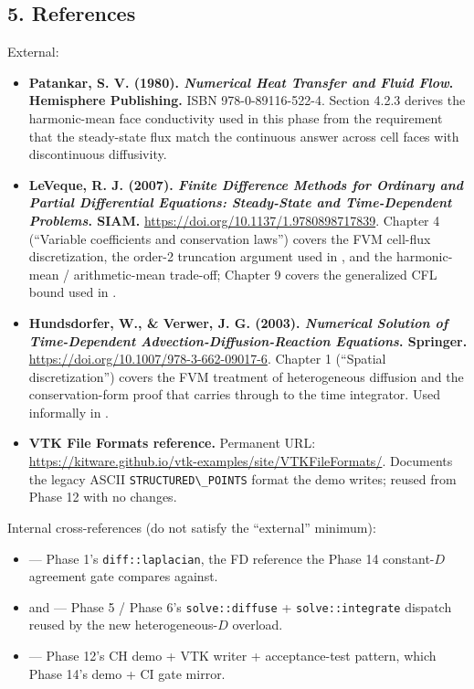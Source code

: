 \subsection{5. References}\label{phase14-references}

External:

\begin{itemize}
\tightlist
\item
  \textbf{Patankar, S. V. (1980). \emph{Numerical Heat Transfer and
  Fluid Flow}. Hemisphere Publishing.} ISBN 978-0-89116-522-4.
  Section 4.2.3 derives the harmonic-mean face conductivity used in
  this phase from the requirement that the steady-state flux match
  the continuous answer across cell faces with discontinuous
  diffusivity.
\item
  \textbf{LeVeque, R. J. (2007). \emph{Finite Difference Methods for
  Ordinary and Partial Differential Equations: Steady-State and
  Time-Dependent Problems}. SIAM.}
  \url{https://doi.org/10.1137/1.9780898717839}. Chapter 4
  (``Variable coefficients and conservation laws'') covers the FVM
  cell-flux discretization, the order-2 truncation argument used
  in
  , and the harmonic-mean / arithmetic-mean
  trade-off; Chapter 9 covers the generalized CFL bound used in
  .
\item
  \textbf{Hundsdorfer, W., \& Verwer, J. G. (2003).
  \emph{Numerical Solution of Time-Dependent Advection-Diffusion-Reaction
  Equations}. Springer.}
  \url{https://doi.org/10.1007/978-3-662-09017-6}. Chapter 1
  (``Spatial discretization'') covers the FVM treatment of
  heterogeneous diffusion and the conservation-form proof that
  carries through to the time integrator. Used informally in
  .
\item
  \textbf{VTK File Formats reference.} Permanent URL:
  \url{https://kitware.github.io/vtk-examples/site/VTKFileFormats/}.
  Documents the legacy ASCII
  \passthrough{\lstinline!STRUCTURED\_POINTS!} format the demo
  writes; reused from Phase 12 with no changes.
\end{itemize}

Internal cross-references (do not satisfy the ``external'' minimum):

\begin{itemize}
\tightlist
\item
   --- Phase 1's
  \passthrough{\lstinline!diff::laplacian!}, the FD reference the
  Phase 14 constant-\(D\) agreement gate compares against.
\item
   and
   --- Phase 5 / Phase
  6's
  \passthrough{\lstinline!solve::diffuse!} +
  \passthrough{\lstinline!solve::integrate!} dispatch reused by the
  new heterogeneous-\(D\) overload.
\item
   --- Phase 12's CH demo + VTK writer
  + acceptance-test pattern, which Phase 14's demo + CI gate
  mirror.
\end{itemize}
